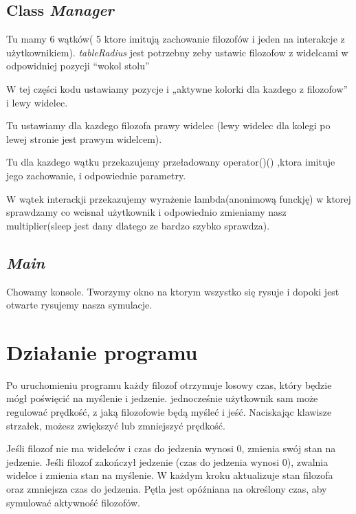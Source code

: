 \documentclass[a4paper, 12pt]{report}
\begin{document}


\subsection{Class \emph{Manager}}

Tu mamy 6 wątków( 5 ktore imitują zachowanie filozofów i jeden na interakcje z użytkownikiem). \emph{tableRadius} jest potrzebny zeby ustawic filozofow z widelcami w odpowidniej pozycji  ``wokol stolu''



W tej części kodu ustawiamy pozycje i „aktywne kolorki dla kazdego z filozofow” i lewy widelec.



Tu ustawiamy dla kazdego filozofa prawy widelec (lewy widelec dla kolegi po lewej stronie jest prawym widelcem).



Tu dla kazdego wątku przekazujemy przeładowany operator()() ,ktora imituje jego zachowanie, i odpowiednie parametry.



W wątek interackji przekazujemy wyrażenie lambda(anonimową funckję) w ktorej sprawdzamy co wcisnał użytkownik i odpowiednio zmieniamy nasz multiplier(sleep jest dany dlatego ze bardzo szybko sprawdza).

\subsection{\emph{Main}}

Chowamy konsole. Tworzymy okno na ktorym wszystko się rysuje i dopoki jest otwarte rysujemy nasza symulacje.



\section{Działanie programu}

Po uruchomieniu programu każdy filozof otrzymuje losowy czas, który będzie mógł poświęcić na myślenie i jedzenie. jednocześnie użytkownik sam może regulować prędkość, z jaką filozofowie będą myśleć i jeść. Naciskając klawisze strzałek, możesz zwiększyć lub zmniejszyć prędkość.

Jeśli filozof nie ma widelców i czas do jedzenia wynosi 0, zmienia swój stan na jedzenie. Jeśli filozof zakończył jedzenie (czas do jedzenia wynosi 0), zwalnia widelce i zmienia stan na myślenie. W każdym kroku aktualizuje stan filozofa oraz zmniejsza czas do jedzenia. Pętla jest opóźniana na określony czas, aby symulować aktywność filozofów.

\printbibliography
\end{document}
